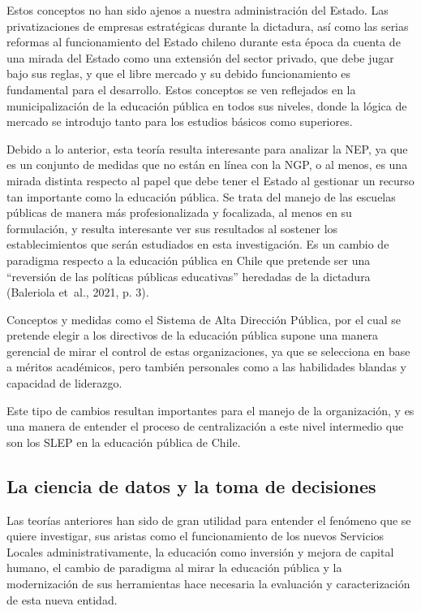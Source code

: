 \documentclass[
  12pt,
  letterpaper,
]{article}
\begin{document}
Estos conceptos no han sido ajenos a nuestra administración del Estado.
Las privatizaciones de empresas estratégicas durante la dictadura, así como las serias reformas al funcionamiento del Estado chileno durante esta época da cuenta de una mirada del Estado como una extensión del sector privado, que debe jugar bajo sus reglas, y que el libre mercado y su debido funcionamiento es fundamental para el desarrollo.
Estos conceptos se ven reflejados en la municipalización de la educación pública en todos sus niveles, donde la lógica de mercado se introdujo tanto para los estudios básicos como superiores.

Debido a lo anterior, esta teoría resulta interesante para analizar la NEP, ya que es un conjunto de medidas que no están en línea con la NGP, o al menos, es una mirada distinta respecto al papel que debe tener el Estado al gestionar un recurso tan importante como la educación pública.
Se trata del manejo de las escuelas públicas de manera más profesionalizada y focalizada, al menos en su formulación, y resulta interesante ver sus resultados al sostener los establecimientos que serán estudiados en esta investigación.
Es un cambio de paradigma respecto a la educación pública en Chile que pretende ser una ``reversión de las políticas públicas educativas'' heredadas de la dictadura (Baleriola et~al., 2021, p. 3).

Conceptos y medidas como el Sistema de Alta Dirección Pública, por el cual se pretende elegir a los directivos de la educación pública supone una manera gerencial de mirar el control de estas organizaciones, ya que se selecciona en base a méritos académicos, pero también personales como a las habilidades blandas y capacidad de liderazgo.

Este tipo de cambios resultan importantes para el manejo de la organización, y es una manera de entender el proceso de centralización a este nivel intermedio que son los SLEP en la educación pública de Chile.

\subsection{La ciencia de datos y la toma de decisiones}\label{la-ciencia-de-datos-y-la-toma-de-decisiones}

Las teorías anteriores han sido de gran utilidad para entender el fenómeno que se quiere investigar, sus aristas como el funcionamiento de los nuevos Servicios Locales administrativamente, la educación como inversión y mejora de capital humano, el cambio de paradigma al mirar la educación pública y la modernización de sus herramientas hace necesaria la evaluación y caracterización de esta nueva entidad.
\end{document}
